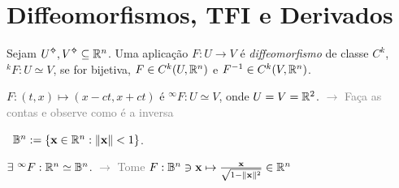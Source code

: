 \section{Diffeomorfismos, TFI e Derivados} 

\begin{definition}
    Sejam \(U\ab, V\ab \subseteq \R^n\). Uma aplicação \(F:U \to V\) é \emph{diffeomorfismo} de classe \(C^k\), \(^kF: U\simeq V\), se for bijetiva, \(F \in C^k(U,\mathbb{R}^n)\)  e \(F^{-1} \in C^k(V,\mathbb{R}^n)\).    
\end{definition}


\begin{example}
   \(F:(t,x)\mapsto (x-ct, x+ct ) \) é \(^\infty F: U\simeq V\), onde \(U=V=\mathbb{R}^2\). \textcolor{gray}{\(\rightarrow \) Faça as contas e observe como é a inversa} 
\end{example}

\begin{definition}
\centering \ \(\mathbb{B}^n:= \{\textbf{x} \in \mathbb{R}^n: \|\textbf{x}\| < 1\}\).
\end{definition}
\begin{example}
    \(\exists \ ^\infty F:\mathbb{R}^n \simeq \mathbb{B}^{n}\).  \textcolor{gray}{\(\rightarrow\) Tome \( F: \mathbb{B}^n  \ni \textbf{x} \mapsto \frac{\textbf{x}}{\sqrt{1-\|\textbf{x}\|^2}}\in \mathbb{R}^n\) }
\end{example}

     
